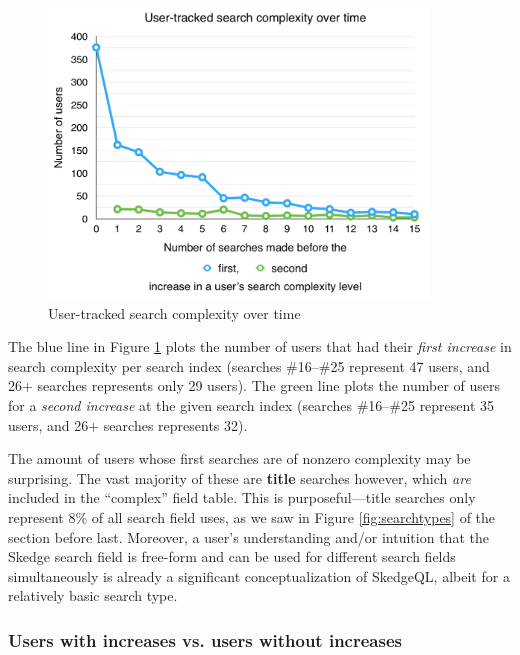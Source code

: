 {\begin{figure}[H]
  \centering
  \includegraphics[width=0.9\textwidth]{images/graph/search_dt}
  
  \caption{User-tracked search complexity over time}
  \label{fig:sc-graph}
\end{figure}

The blue line in Figure \ref{fig:sc-graph} plots the number of users that had their \emph{first increase} in search complexity per search index (searches \#16--\#25 represent 47 users, and 26+ searches represents only 29 users). The green line plots the number of users for a \emph{second increase} at the given search index (searches \#16--\#25 represent 35 users, and 26+ searches represents 32).

The amount of users whose first searches are of nonzero complexity may be surprising. The vast majority of these are \textbf{title} searches however, which \emph{are} included in the ``complex'' field table. This is purposeful---title searches only represent 8\% of all search field uses, as we saw in Figure \ref{fig:searchtypes} of the section before last. Moreover, a user's understanding and/or intuition that the Skedge search field is free-form and can be used for different search fields simultaneously is already a significant conceptualization of SkedgeQL, albeit for a relatively basic search type.

\subsubsection{Users with increases vs. users without increases}

}
